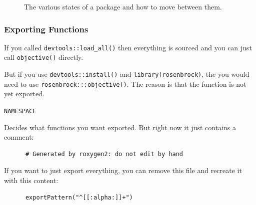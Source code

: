 \documentclass[aspectratio=1610,onlytextwidth]{beamer}
\begin{document}
\begin{frame}[c]
  \begin{figure}[htpb]
    \centering
    \caption{%
      The various states of a package and how to move between them.
    }
  \end{figure}
\end{frame}

\begin{frame}[c,fragile]
  \frametitle{Exporting Functions}

  If you called \lstinline{devtools::load_all()} then everything is sourced and you can
  just call \lstinline{objective()} directly.

  \bigskip

  But if you use \lstinline{devtools::install()} and \lstinline{library(rosenbrock)}, the
  you would need to use \lstinline{rosenbrock:::objective()}. The reason is that
  the function is not yet exported.

  \medskip\pause

  \begin{block}{\texttt{NAMESPACE}}

    Decides what functions you want exported. But right now it just contains a comment:
    \begin{lstlisting}
      # Generated by roxygen2: do not edit by hand
    \end{lstlisting}

    \pause\medskip

    If you want to just export everything, you can remove this file and recreate it with this content:
    \begin{lstlisting}
      exportPattern("^[[:alpha:]]+")
    \end{lstlisting}

  \end{block}
\end{frame}
\end{document}
